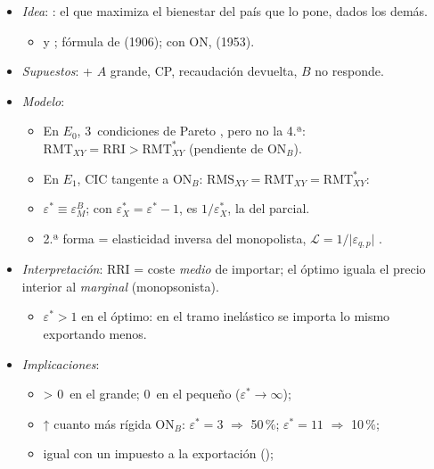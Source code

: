 \documentclass{article}
\begin{document}
\begin{columnas}
\begin{itemize}
\item \emph{Idea}: : el que maximiza el bienestar del país que lo pone, dados los demás.
  \begin{itemize}
  \item {} y ; fórmula de  (1906); con ON,  (1953).
  \end{itemize}
\item \emph{Supuestos}:  + $A$ grande, CP, recaudación devuelta, $B$ no responde.
\item \emph{Modelo}:
  \begin{itemize}
  \item En $E_0$, 3~condiciones de Pareto , pero no la 4.ª: $\mathrm{RMT}_{XY}=\mathrm{RRI}>\mathrm{RMT}^*_{XY}$ (pendiente de ON$_B$).
  \item En $E_1$, CIC tangente a ON$_B$: $\mathrm{RMS}_{XY}=\mathrm{RMT}_{XY}=\mathrm{RMT}^*_{XY}$:
  \item $\varepsilon^*\equiv\varepsilon^B_M$; con $\varepsilon^*_X=\varepsilon^*-1$, es $1/\varepsilon^*_X$, la del parcial.
  \item 2.ª forma = elasticidad inversa del monopolista, $\mathcal L=1/\lvert\varepsilon_{q,p}\rvert$ .
  \end{itemize}
\end{itemize}
\begin{itemize}
\item \emph{Interpretación}: RRI = coste \emph{medio} de importar; el óptimo iguala el precio interior al \emph{marginal} (monopsonista).
  \begin{itemize}
  \item $\varepsilon^*>1$ en el óptimo: en el tramo inelástico se importa lo mismo exportando menos.
  \end{itemize}
\item \emph{Implicaciones}:
  \begin{itemize}
  \item > 0~en el grande; 0~en el pequeño ($\varepsilon^*\to\infty$);
  \item ↑ cuanto más rígida ON$_B$: $\varepsilon^*=3$ $\Rightarrow$ 50\,\%; $\varepsilon^*=11$ $\Rightarrow$ 10\,\%;
  \item igual con un impuesto a la exportación ();

\end{itemize}
\end{itemize}
\end{columnas}
\end{document}
